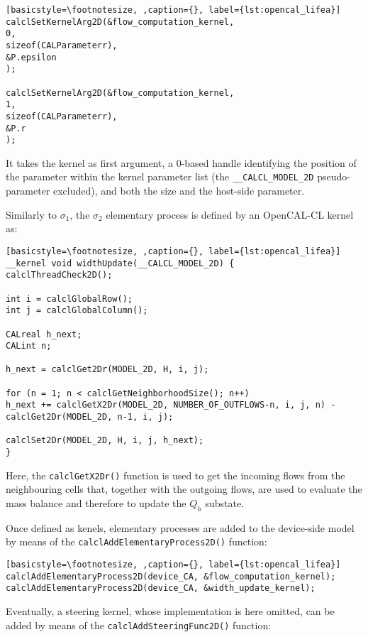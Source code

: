\begin{lstlisting}[basicstyle=\footnotesize, ,caption={}, label={lst:opencal_lifea}]
calclSetKernelArg2D(&flow_computation_kernel,
0,
sizeof(CALParameterr),
&P.epsilon
);

calclSetKernelArg2D(&flow_computation_kernel,
1,
sizeof(CALParameterr),
&P.r
);
\end{lstlisting}

\noindent It takes the kernel as first argument, a 0-based handle
identifying the position of the parameter within the kernel
parameter list (the \verb'__CALCL_MODEL_2D' pseudo-parameter
excluded), and both the size and the host-side parameter.

Similarly to $\sigma_1$, the $\sigma_2$ elementary process is
defined by an OpenCAL-CL kernel as:

\begin{lstlisting}[basicstyle=\footnotesize, ,caption={}, label={lst:opencal_lifea}]
__kernel void widthUpdate(__CALCL_MODEL_2D) {
calclThreadCheck2D();

int i = calclGlobalRow();
int j = calclGlobalColumn();

CALreal h_next;
CALint n;

h_next = calclGet2Dr(MODEL_2D, H, i, j);

for (n = 1; n < calclGetNeighborhoodSize(); n++)
h_next += calclGetX2Dr(MODEL_2D, NUMBER_OF_OUTFLOWS-n, i, j, n) - calclGet2Dr(MODEL_2D, n-1, i, j);

calclSet2Dr(MODEL_2D, H, i, j, h_next);
}
\end{lstlisting}

\noindent Here, the \verb'calclGetX2Dr()' function is used to get
the incoming flows from the neighbouring cells that, together with
the outgoing flows, are used to evaluate the mass balance and
therefore to update the $Q_h$ substate.

Once defined as kenels, elementary processes are added to the
device-side model by means of the
\verb'calclAddElementaryProcess2D()' function:

\begin{lstlisting}[basicstyle=\footnotesize, ,caption={}, label={lst:opencal_lifea}]
calclAddElementaryProcess2D(device_CA, &flow_computation_kernel);
calclAddElementaryProcess2D(device_CA, &width_update_kernel);
\end{lstlisting}

\noindent Eventually, a steering kernel, whose implementation is
here omitted, can be added by means of the
\verb'calclAddSteeringFunc2D()' function:

